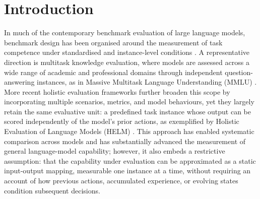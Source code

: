 \documentclass[pdflatex,sn-mathphys-num]{sn-jnl}%
\theoremstyle{thmstyleone}%
\theoremstyle{thmstyletwo}%
\theoremstyle{thmstylethree}%
\begin{document}
\section{Introduction}\label{sec1}

In much of the contemporary benchmark evaluation of large language models, benchmark design has been organised around the measurement of task competence under standardised and instance-level conditions \cite{srivastava2022beyond}. A representative direction is multitask knowledge evaluation, where models are assessed across a wide range of academic and professional domains through independent question-answering instances, as in Massive Multitask Language Understanding (MMLU) \cite{hendrycks2020measuring} . More recent holistic evaluation frameworks further broaden this scope by incorporating multiple scenarios, metrics, and model behaviours, yet they largely retain the same evaluative unit: a predefined task instance whose output can be scored independently of the model's prior actions, as exemplified by Holistic Evaluation of Language Models (HELM) \cite{liang2022holistic}. This approach has enabled systematic comparison across models and has substantially advanced the measurement of general language-model capability; however, it also embeds a restrictive assumption: that the capability under evaluation can be approximated as a static input-output mapping, measurable one instance at a time, without requiring an account of how previous actions, accumulated experience, or evolving states condition subsequent decisions.
\end{document}
